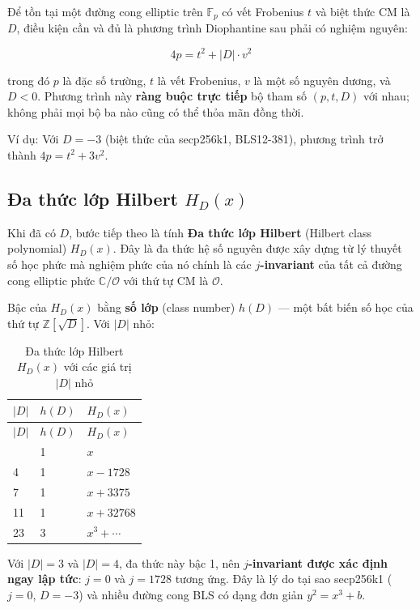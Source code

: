 Để tồn tại một đường cong elliptic trên \(\mathbb{F}_p\) có vết
Frobenius \(t\) và biệt thức CM là \(D\), điều kiện cần và đủ là phương
trình Diophantine sau phải có nghiệm nguyên:

\[4p = t^2 + |D| \cdot v^2\]

trong đó \(p\) là đặc số trường, \(t\) là vết Frobenius, \(v\) là một số
nguyên dương, và \(D < 0\). Phương trình này \textbf{ràng buộc trực
tiếp} bộ tham số \((p, t, D)\) với nhau; không phải mọi bộ ba nào cũng
có thể thỏa mãn đồng thời.

Ví dụ: Với \(D = -3\) (biệt thức của secp256k1, BLS12-381), phương trình
trở thành \(4p = t^2 + 3v^2\).

\subsection{\texorpdfstring{Đa thức lớp Hilbert
\(H_D(x)\)}{Đa thức lớp Hilbert H\_D(x)}}\label{ux111a-thux1ee9c-lux1edbp-hilbert-h_dx}

Khi đã có \(D\), bước tiếp theo là tính \textbf{Đa thức lớp Hilbert}
(Hilbert class polynomial) \(H_D(x)\). Đây là đa thức hệ số nguyên được
xây dựng từ lý thuyết số học phức mà nghiệm phức của nó chính là các
\textbf{\(j\)-invariant} của tất cả đường cong elliptic phức
\(\mathbb{C}/\mathcal{O}\) với thứ tự CM là \(\mathcal{O}\).

Bậc của \(H_D(x)\) bằng \textbf{số lớp} (class number) \(h(D)\) --- một
bất biến số học của thứ tự \(\mathbb{Z}[\sqrt{D}]\). Với \(|D|\) nhỏ:

\begin{longtable}[]{@{}lll@{}}
\caption{Đa thức lớp Hilbert \(H_D(x)\) với các giá trị \(|D|\)
nhỏ}\tabularnewline
\toprule\noalign{}
\(\lvert D \rvert\) & \(h(D)\) & \(H_D(x)\) \\
\midrule\noalign{}
\endfirsthead
\toprule\noalign{}
\(\lvert D \rvert\) & \(h(D)\) & \(H_D(x)\) \\
\midrule\noalign{}
\endhead
\bottomrule\noalign{}
\endlastfoot
3 & 1 & \(x\) \\
4 & 1 & \(x - 1728\) \\
7 & 1 & \(x + 3375\) \\
11 & 1 & \(x + 32768\) \\
23 & 3 & \(x^3 + \cdots\) \\
\end{longtable}

Với \(|D| = 3\) và \(|D| = 4\), đa thức này bậc 1, nên
\textbf{\(j\)-invariant được xác định ngay lập tức}: \(j = 0\) và
\(j = 1728\) tương ứng. Đây là lý do tại sao secp256k1 (\(j=0\),
\(D=-3\)) và nhiều đường cong BLS có dạng đơn giản \(y^2 = x^3 + b\).

